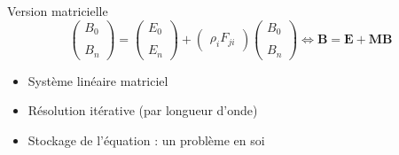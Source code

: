 \begin{frame}{Version matricielle}
    $$
    \begin{pmatrix}
        B_0 \\ \\ B_n
    \end{pmatrix}
    = 
    \begin{pmatrix}
        E_0 \\ \\ E_n
    \end{pmatrix}
    +
    \begin{pmatrix}
        \rho_i F_{ji}       
    \end{pmatrix}
    \begin{pmatrix}
        B_0 \\ \\ B_n
    \end{pmatrix}
    \Longleftrightarrow
    \boldsymbol{B} = \boldsymbol{E} + \boldsymbol{MB}
$$
\begin{itemize}
    \item Système linéaire matriciel 
    \item Résolution itérative (par longueur d'onde)
    \item Stockage de l'équation : un problème en soi 
\end{itemize}
\end{frame}


